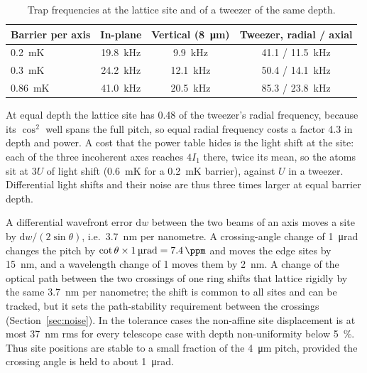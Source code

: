 \documentclass[11pt]{article}
\begin{document}
\begin{table}[htbp]
\centering
\caption{Trap frequencies at the lattice site and of a tweezer of the same depth.}
\label{tab:freq}
\small
\begin{tabular}{@{}lccc@{}}
\toprule
Barrier per axis & In-plane & Vertical (\SI{8}{\micro\metre}) & Tweezer, radial / axial \\
\midrule
\SI{0.2}{\milli\kelvin} & \SI{19.8}{\kilo\hertz} & \SI{9.9}{\kilo\hertz} & 41.1 / \SI{11.5}{\kilo\hertz} \\
\SI{0.3}{\milli\kelvin} & \SI{24.2}{\kilo\hertz} & \SI{12.1}{\kilo\hertz} & 50.4 / \SI{14.1}{\kilo\hertz} \\
\SI{0.86}{\milli\kelvin} & \SI{41.0}{\kilo\hertz} & \SI{20.5}{\kilo\hertz} & 85.3 / \SI{23.8}{\kilo\hertz} \\
\bottomrule
\end{tabular}
\end{table}

At equal depth the lattice site has 0.48 of the tweezer's radial frequency, because its $\cos^{2}$ well
spans the full pitch, so equal radial frequency costs a factor 4.3 in depth and power. A cost that the
power table hides is the light shift at the site: each of the three incoherent axes reaches $4 I_1$
there, twice its mean, so the atoms sit at $3U$ of light shift (\SI{0.6}{\milli\kelvin} for a
\SI{0.2}{\milli\kelvin} barrier), against $U$ in a tweezer. Differential light shifts and their noise are
thus three times larger at equal barrier depth.

A differential wavefront error $\mathrm{d}w$ between the two beams of an axis moves a site by
$\mathrm{d}w/(2\sin\theta)$, i.e.\ \SI{3.7}{\nano\metre} per nanometre. A crossing-angle change of
\SI{1}{\micro\radian} changes the pitch by $\cot\theta \times \SI{1}{\micro\radian} = \SI{7.4}{\ppm}$ and
moves the edge sites by \SI{15}{\nano\metre}, and a wavelength change of \SI{1}{\ppm} moves them by
\SI{2}{\nano\metre}. A change of the optical path between the two crossings of one ring shifts that
lattice rigidly by the same \SI{3.7}{\nano\metre} per nanometre; the shift is common to all sites and can
be tracked, but it sets the path-stability requirement between the crossings (Section~\ref{sec:noise}).
In the tolerance cases the non-affine site displacement is at most \SI{37}{\nano\metre} rms for every
telescope case with depth non-uniformity below \SI{5}{\percent}. Thus site positions are stable to a small
fraction of the \SI{4}{\micro\metre} pitch, provided the crossing angle is held to about
\SI{1}{\micro\radian}.
\end{document}
